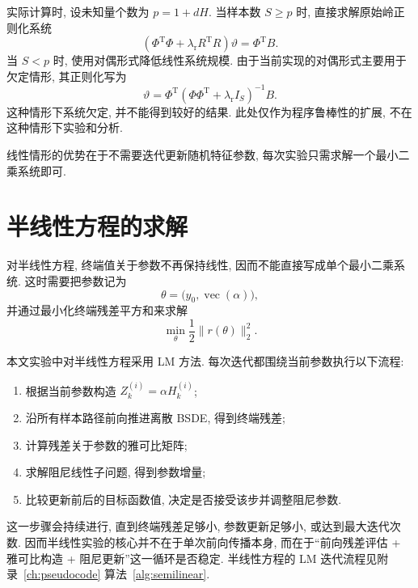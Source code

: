     实际计算时, 设未知量个数为 $p=1 + dH$.
    当样本数 $S \ge p$ 时, 直接求解原始岭正则化系统
    \begin{equation}
      \left(\Phi^{\operatorname{T}}\Phi+\lambda_{\mathrm{r}}R^{\operatorname{T}}R\right)\vartheta
      = \Phi^{\operatorname{T}}B.
      \label{eq:primal}
    \end{equation}
    当 $S < p$ 时, 使用对偶形式降低线性系统规模.
    由于当前实现的对偶形式主要用于欠定情形, 其正则化写为
    \begin{equation}
      \vartheta =
      \Phi^{\operatorname{T}} \left(\Phi\Phi^{\operatorname{T}}+\lambda_{\mathrm{r}}I_S\right)^{-1}B.
      \label{eq:dual}
    \end{equation}
    这种情形下系统欠定, 并不能得到较好的结果.
    此处仅作为程序鲁棒性的扩展, 不在这种情形下实验和分析.

    线性情形的优势在于不需要迭代更新随机特征参数, 每次实验只需求解一个最小二乘系统即可.

  \section{半线性方程的求解}\label{sec:nonlinear}
    对半线性方程, 终端值关于参数不再保持线性, 因而不能直接写成单个最小二乘系统.
    这时需要把参数记为
    \begin{equation*}
      \theta = \bigl(y_{0}, \operatorname{vec}(\alpha)\bigr),
    \end{equation*}
    并通过最小化终端残差平方和来求解
    \begin{equation*}
      \min_{\theta} \frac{1}{2}\lVert r(\theta) \rVert_{2}^{2}.
    \end{equation*}

    本文实验中对半线性方程采用 LM 方法.
    每次迭代都围绕当前参数执行以下流程:
    \begin{enumerate}
      \item 根据当前参数构造 $Z_{k}^{(i)} = \alpha H_{k}^{(i)}$;
      \item 沿所有样本路径前向推进离散 BSDE, 得到终端残差;
      \item 计算残差关于参数的雅可比矩阵;
      \item 求解阻尼线性子问题, 得到参数增量;
      \item 比较更新前后的目标函数值, 决定是否接受该步并调整阻尼参数.
    \end{enumerate}

    这一步骤会持续进行, 直到终端残差足够小, 参数更新足够小, 或达到最大迭代次数.
    因而半线性实验的核心并不在于单次前向传播本身,
    而在于“前向残差评估 + 雅可比构造 + 阻尼更新”这一循环是否稳定.
    半线性方程的 LM 迭代流程见附录~\ref{ch:pseudocode} 算法~\ref{alg:semilinear}.

